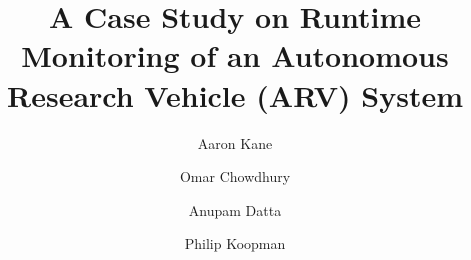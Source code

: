 \documentclass[]{./llncs}
\begin{document}
\title{A Case Study on Runtime Monitoring of an Autonomous Research Vehicle (ARV) System}


\author{Aaron Kane \and Omar Chowdhury \and Anupam Datta \and Philip Koopman}



\maketitle


\end{document}
